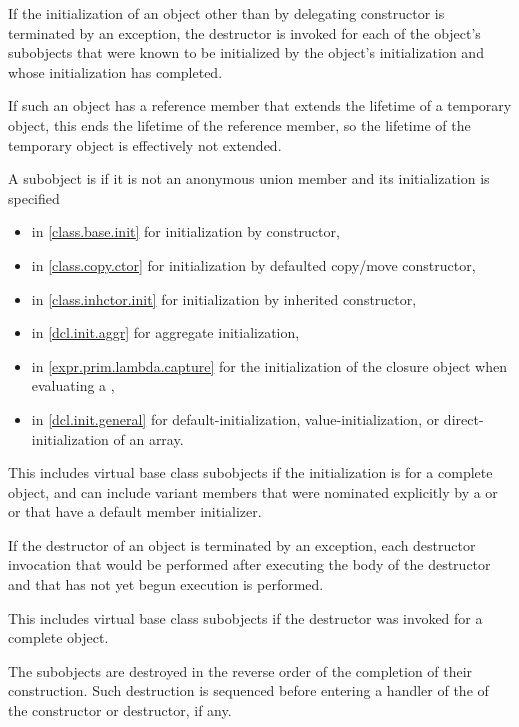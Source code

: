 \pnum
If the initialization of an object
other than by delegating constructor
is terminated by an exception,
the destructor is invoked for
each of the object's subobjects
that were known to be initialized by the object's initialization and
whose initialization has completed.
\begin{note}
If such an object has a reference member
that extends the lifetime of a temporary object,
this ends the lifetime of the reference member,
so the lifetime of the temporary object is effectively not extended.
\end{note}
%
A subobject is 
if it is not an anonymous union member and
its initialization is specified
\begin{itemize}
\item in \ref{class.base.init} for initialization by constructor,
\item in \ref{class.copy.ctor} for initialization by defaulted copy/move constructor,
\item in \ref{class.inhctor.init} for initialization by inherited constructor,
\item in \ref{dcl.init.aggr} for aggregate initialization,
\item in \ref{expr.prim.lambda.capture} for the initialization of
the closure object when evaluating a ,
\item in \ref{dcl.init.general} for
default-initialization, value-initialization, or direct-initialization
of an array.
\end{itemize}
\begin{note}
This includes virtual base class subobjects
if the initialization
is for a complete object, and
can include variant members
that were nominated explicitly by
a  or  or
that have a default member initializer.
\end{note}
If the destructor of an object is terminated by an exception,
each destructor invocation
that would be performed after executing the body of the destructor and
that has not yet begun execution
is performed.
\begin{note}
This includes virtual base class subobjects if
the destructor was invoked for a complete object.
\end{note}
The subobjects are destroyed in the reverse order of the completion of
their construction. Such destruction is sequenced before entering a
handler of the  of the constructor or destructor,
if any.

